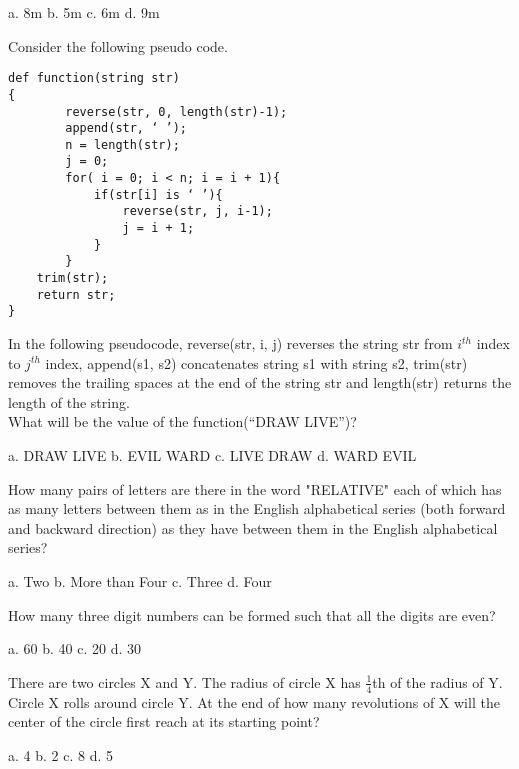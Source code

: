 \documentclass[a4paper, addpoints]{exam}
\begin{document}
\begin{questions}
	\begin{oneparcheckboxes}
		\choice a. 8m
		\choice b. 5m
		\choice c. 6m
		\choice d. 9m
	\end{oneparcheckboxes}
	\question Consider the following pseudo code.
	\begin{verbatim}
def function(string str)
{
		reverse(str, 0, length(str)-1);
		append(str, ‘ ’);
		n = length(str);
		j = 0;
		for( i = 0; i < n; i = i + 1){
			if(str[i] is ‘ ’){
				reverse(str, j, i-1);
				j = i + 1;
			}
		}
	trim(str);
	return str;
}
\end{verbatim}
In the following pseudocode, reverse(str, i, j) reverses the string str from $i^{th}$ index to $j^{th}$ index, append(s1, s2) concatenates string s1 with string s2, trim(str) removes the trailing spaces at the end of the string str and length(str) returns the length of the string.\\
What will be the value of the function(“DRAW LIVE”)?\\

	\begin{oneparcheckboxes}
		\choice a. DRAW LIVE
		\choice b. EVIL WARD
		\choice c. LIVE DRAW
		\choice d. WARD EVIL
	\end{oneparcheckboxes}
	\question How many pairs of letters are there in the word "RELATIVE" each of which has as many letters between them as in the English alphabetical series (both forward and backward direction) as they have between them in the English alphabetical series?\\

	\begin{oneparcheckboxes}
		\choice a. Two
		\choice b. More than Four
		\choice c. Three
		\choice d. Four
	\end{oneparcheckboxes}
	
	\question How many three digit numbers can be formed such that all the digits are even?
	
	\begin{oneparcheckboxes}
		\choice a. 60
		\choice b. 40
		\choice c. 20
		\choice d. 30
	\end{oneparcheckboxes}
	
	\question There are two circles X and Y. The radius of circle X has $\frac{1}{4}$th of the radius of Y. Circle X rolls around circle Y. At the end of how many revolutions of X will the center of the circle first reach at its starting point?\\
	
	\begin{oneparcheckboxes}
		\choice a. 4
		\choice b. 2
		\choice c. 8
		\choice d. 5
	\end{oneparcheckboxes}
	

\end{questions}
\end{document}
